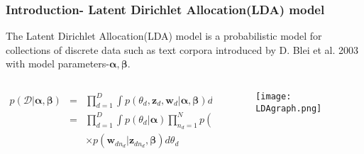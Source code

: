 \documentclass[10pt]{beamer}
\newcommand{\bs}{\boldsymbol}
\newcommand{\ba}{\begin{array}}
\newcommand{\ea}{\end{array}}
\newcommand{\Prod}{\displaystyle\prod}
\begin{document}
\begin{frame}
	\frametitle{Introduction- Latent Dirichlet Allocation(LDA) model }
The Latent Dirichlet Allocation(LDA) model is a probabilistic model for collections of discrete data such as text corpora introduced by D. Blei et al. 2003 with model parameters-$\bs{\alpha},\bs{\beta}$. 
\begin{columns}[T] %
	\begin{column}{.48\textwidth}
		\vspace{5ex}
\begin{equation*}
	\ba{rcl}
		p(\mathcal{D}|\bs{\alpha},\bs{\beta})&=&\Prod_{d=1}^{D}\int p(\theta_d,\bs{z}_d,\bs{w}_d|\bs{\alpha},\bs{\beta})d\theta_d\\
		&=&\Prod_{d=1}^{D}\int p(\theta_d|\bs{\alpha})\Prod_{n_d=1}^{N}p(\bs{z}_{dn_d}|\theta_d)\\
		&&\times p(\bs{w}_{dn_d}|\bs{z}_{dn_d},\bs{\beta})d\theta_d
	\ea
\end{equation*}
				\end{column}%
					\begin{column}{.48\textwidth}
	\begin{figure}[b]
		\texttt{[image: LDAgraph.png]}
	\end{figure}
\end{column}%
\end{columns}	 
\end{frame}		
\end{document}
